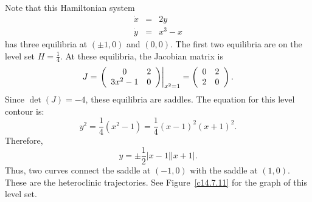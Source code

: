 \begin{figure}[htb]
     \centerline{%
     }
\end{figure} 

Note that this Hamiltonian system
\begin{eqnarray*}
\dot{x}& = & 2y\\
\dot{y} &  =&  x^3 -x
\end{eqnarray*}
has three equilibria at $(\pm 1,0)$ and $(0,0)$.  The first two equilibria
are on the level set $H= \frac{1}{4}$.  At these equilibria, the Jacobian
matrix is
\[
J = \left.\left(\begin{array}{cc} 0 & 2\\ 3x^2-1 &0\end{array}\right)\right|_{x^2=1} = 
\left(\begin{array}{cc} 0 & 2\\ 2 &0\end{array}\right).
\]
Since $\det(J)=-4$, these equilibria are saddles.
The equation for this level contour is: 
\[
y^2=\frac{1}{4}(x^2-1)=\frac{1}{4}(x-1)^2(x+1)^2.
\]
Therefore,
\[
y = \pm\frac{1}{2}|x-1||x+1|.
\]
Thus, two curves connect the saddle at $(-1,0)$ with the saddle at $(1,0)$.
These are the heteroclinic trajectories. See
Figure~\ref{c14.7.11} for the graph of this level set.

\begin{figure}[htb]
     \centerline{%
      }
\end{figure} 
 